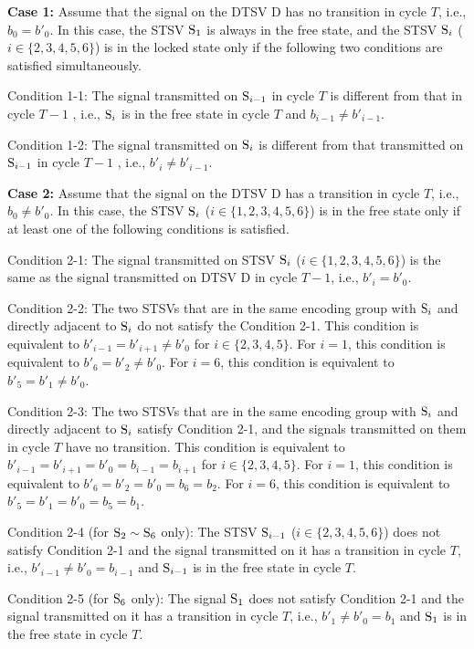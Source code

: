 \documentclass[lettersize,journal]{IEEEtran}
\begin{document}
{\bf Case 1:} Assume that the signal on the DTSV D has no transition in cycle $T$, i.e., $b_0={b'}_0$. In this case, the STSV $\rm S_1$ is always in the free state, and the STSV ${\rm S}_i$ ($i\in \{2,3,4,5,6\}$) is in the locked state only if the following two conditions are satisfied simultaneously.

Condition 1-1: The signal transmitted on ${\rm S}_{i-1}$ in cycle $T$ is different from that in cycle $T-1$ , i.e., ${\rm S}_i$ is in the free state in cycle $T$ and $b_{i-1}\neq {b'}_{i-1}$.

Condition 1-2: The signal transmitted on ${\rm S}_i$ is different from that transmitted on ${\rm S}_{i-1}$ in cycle $T-1$ , i.e., ${b'}_i\neq {b'}_{i-1}$.

{\bf Case 2:} Assume that the signal on the DTSV D has a transition in cycle $T$, i.e., $b_0\neq {b'}_0$. In this case, the STSV ${\rm S}_i$ ($i\in \{1,2,3,4,5,6\}$) is in the free state only if at least one of the following conditions is satisfied.

Condition 2-1: The signal transmitted on STSV ${\rm S}_i$ ($i\in \{1,2,3,4,5,6\}$) is the same as the signal transmitted on DTSV D in cycle $T-1$, i.e., ${b'}_i={b'}_0$.

Condition 2-2: The two STSVs that are in the same encoding group with ${\rm S}_i$ and directly adjacent to ${\rm S}_i$ do not satisfy the Condition 2-1. This condition is equivalent to ${b'}_{i-1} = {b'}_{i+1} \neq {b'}_0$ for $i\in \{2,3,4,5\}$. For $i=1$, this condition is equivalent to ${b'}_6 = {b'}_2 \neq {b'}_0$. For $i=6$, this condition is equivalent to ${b'}_5 = {b'}_1 \neq {b'}_0$.

Condition 2-3: The two STSVs that are in the same encoding group with ${\rm S}_i$ and directly adjacent to ${\rm S}_i$ satisfy Condition 2-1, and the signals transmitted on them in cycle $T$ have no transition. This condition is equivalent to ${b'}_{i-1} = {b'}_{i+1} = {b'}_0 = b_{i-1} = b_{i+1}$ for $i\in \{2,3,4,5\}$. For $i=1$, this condition is equivalent to  ${b'}_6 = {b'}_2 = {b'}_0 = b_6 = b_2$. For $i=6$, this condition is equivalent to ${b'}_5 = {b'}_1 = {b'}_0 = b_5 = b_1$.

Condition 2-4 (for ${\rm S}_2\sim {\rm S}_6$ only): The STSV ${\rm S}_{i-1}$ ($i\in \{ 2,3,4,5,6\}$) does not satisfy Condition 2-1 and the signal transmitted on it has a transition in cycle $T$, i.e., ${b'}_{i-1} \neq {b'}_0 = b_{i-1}$ and ${\rm S}_{i-1}$ is in the free state in cycle $T$.

Condition 2-5 (for ${\rm S}_6$ only): The signal ${\rm S}_1$ does not satisfy Condition 2-1 and the signal transmitted on it has a transition in cycle $T$, i.e., ${b'}_1 \neq {b'}_0 = b_1$ and ${\rm S}_1$ is in the free state in cycle $T$.
\end{document}
